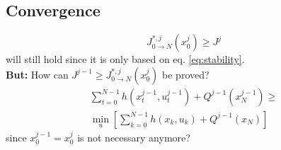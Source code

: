 \documentclass{article}
\begin{document}
\subsection{Convergence}
\begin{equation}
J_{0\rightarrow N}^{*,j}(x_0^j)\geq J^j
\end{equation}
will still hold since it is only based on eq. \ref{eq:stability}.\\

\textbf{But:} How can $J^{j-1}\geq J_{0\rightarrow N}^{*,j}(x_0^j)$ be proved?
\begin{align}
\sum_{t=0}^{N-1}h(x_t^{j-1},u_t^{j-1})+Q^{j-1}(x_N^{j-1})\geq\\
\min_u\left[\sum_{k=0}^{N-1}h(x_k,u_k)+Q^{j-1}(x_N)\right]
\end{align}
since $x_0^{j-1}=x_0^j$ is not necessary anymore?
%
\end{document}
